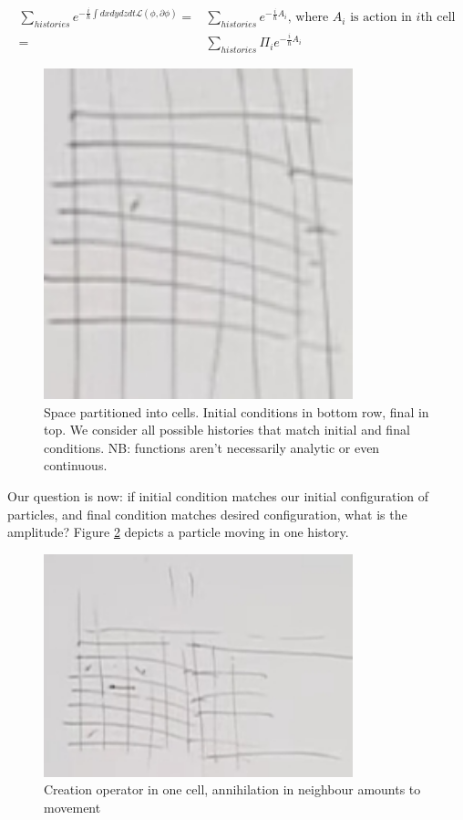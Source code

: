 \documentclass[]{article}
\begin{document}
\begin{align*}
\sum_{histories} e^{-\frac{i}{\hslash} \int dx dy dz dt\mathcal{L}(\phi,\partial \phi) }=&\sum_{histories} e^{-\frac{i}{\hslash} A_i } \text{, where $A_i$ is action in $i$th cell}\\
=&\sum_{histories} \Pi_i e^{-\frac{i}{\hslash} A_i }
\end{align*}
\begin{figure}[H]
	\caption[Space partitioned into cells]{Space partitioned into cells. Initial conditions in bottom row, final in top. We consider all possible histories that match initial and final conditions. NB: functions aren't necessarily analytic or even continuous.}\label{fig:path-integral2}
	\includegraphics[width=0.8\textwidth]{path-integral2}
\end{figure}

Our question is now: if initial condition matches our initial configuration of particles, and final condition matches desired configuration, what is the amplitude? Figure \ref{fig:path-integral3} depicts a particle moving in one history.

\begin{figure}[H]
	\caption[Particle moving]{Creation operator in one cell, annihilation in neighbour amounts to movement}\label{fig:path-integral3}
	\includegraphics[width=0.8\textwidth]{path-integral3}
\end{figure}
\end{document}
